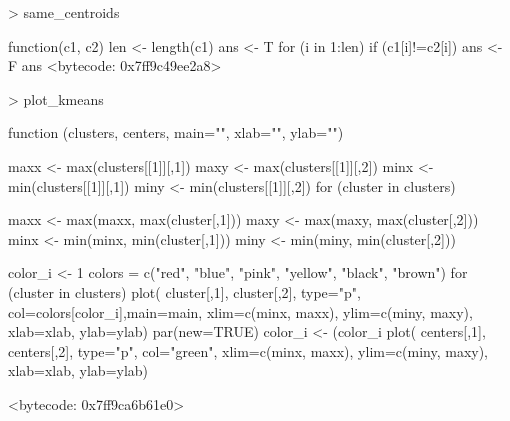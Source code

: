\documentclass [a4paper] {article}
\begin{document}
\begin{Schunk}
\begin{Soutput}
\end{Soutput}
\begin{Sinput}
> same_centroids
\end{Sinput}
\begin{Soutput}
function(c1, c2){
  len <- length(c1)
  ans <- T
  for (i in 1:len){
    if (c1[i]!=c2[i]){
      ans <- F
    }
  }
  ans
}
<bytecode: 0x7ff9c49ee2a8>
\end{Soutput}
\begin{Sinput}
> plot_kmeans
\end{Sinput}
\begin{Soutput}
function (clusters, centers, main="", xlab="", ylab="") {
  maxx <- max(clusters[[1]][,1])
  maxy <- max(clusters[[1]][,2])
  minx <- min(clusters[[1]][,1])
  miny <- min(clusters[[1]][,2])
  for (cluster in clusters){
    maxx <- max(maxx, max(cluster[,1]))
    maxy <- max(maxy, max(cluster[,2]))
    minx <- min(minx, min(cluster[,1]))
    miny <- min(miny, min(cluster[,2]))

  }
  color_i <- 1
  colors = c("red", "blue", "pink", "yellow", "black", "brown")
  for (cluster in clusters){
    plot( cluster[,1], cluster[,2], type="p", col=colors[color_i],main=main,
          xlim=c(minx, maxx), ylim=c(miny, maxy), xlab=xlab, ylab=ylab)
    par(new=TRUE)
    color_i <- (color_i%
  }
  plot( centers[,1], centers[,2], type="p", col="green",
        xlim=c(minx, maxx), ylim=c(miny, maxy), xlab=xlab, ylab=ylab)
}
<bytecode: 0x7ff9ca6b61e0>
\end{Soutput}
\end{Schunk}
\end{document}
